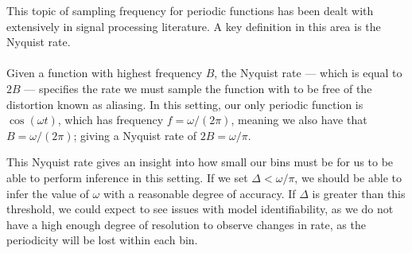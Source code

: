 \documentclass[11pt,a4,twosided,singlespacing,titlepagenumber=on,numbers=endperiod]{scrreprt}
\numberwithin{equation}{chapter} %
\theoremstyle{remark}
\begin{document}
This topic of sampling frequency for periodic functions has been dealt with extensively in signal processing literature. A key definition in this area is the Nyquist rate. \\\\
Given a function with highest frequency $B$, the Nyquist rate \cite{nyquist} --- which is equal to $2B$ --- specifies the rate we must sample the function with to be free of the distortion known as aliasing. In this setting, our only periodic function is $\cos(\omega t)$, which has frequency $f = \omega / (2 \pi)$, meaning we also have that $B = \omega / (2 \pi)$; giving a Nyquist rate of $2B = \omega / \pi$.

This Nyquist rate gives an insight into how small our bins must be for us to be able to perform inference in this setting. If we set $\Delta < \omega / \pi$, we should be able to infer the value of $\omega$ with a reasonable degree of accuracy. If $\Delta$ is greater than this threshold, we could expect to see issues with model identifiability, as we do not have a high enough degree of resolution to observe changes in rate, as the periodicity will be lost within each bin.
\end{document}
